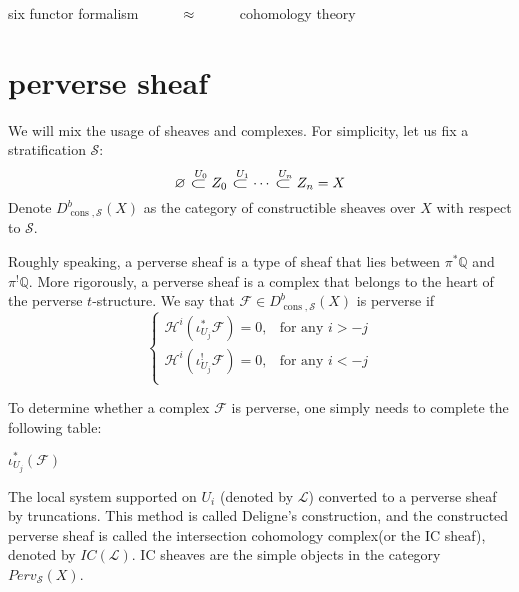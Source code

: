 \documentclass[UTF8]{amsart}
\numberwithin{equation}{section}
\theoremstyle{plain}
\numberwithin{equation}{section}
\theoremstyle{remark}
\DeclareMathOperator{\constructable}{\operatorname{cons}}
\begin{document}
six functor formalism $\hspace{10mm}\approx\hspace{10mm}$ cohomology theory

\section{perverse sheaf}

We will mix the usage of sheaves and complexes. For simplicity, let us fix a stratification $\mathcal{S}$:
\newcommand\largesubset{\mathrel{\scalebox{1.5}[1]{\(\subset\)}}}
$$\varnothing \overset{\;\,U_0}{\largesubset} Z_0 \overset{\;\,U_1}{\largesubset}\cdots  \overset{\;\,U_n}{\largesubset} Z_n = X$$
Denote $D_{\constructable,\mathcal{S}}^{b}(X)$ as the category of constructible sheaves over $X$ with respect to $\mathcal{S}$.

Roughly speaking, a perverse sheaf is a type of sheaf that lies between $\pi^* \mathbb{Q}$ and $\pi^! \mathbb{Q}$. More rigorously, a perverse sheaf is a complex that belongs to the heart of the perverse $t$-structure. We say that $\mathcal{F} \in D_{\constructable,\mathcal{S}}^{b}(X)$ is perverse if 
$$
\begin{cases}
\mathcal{H}^i\left(\iota_{U_j}^* \mathcal{F}\right) = 0, & \text{for any } i > -j\\
\mathcal{H}^i\left(\iota_{U_j}^! \mathcal{F}\right) = 0, & \text{for any } i < -j\\
\end{cases}
$$


To determine whether a complex $\mathcal{F}$ is perverse, one simply needs to complete the following table:

$\iota_{U_j}^*(\mathcal{F})$

The local system supported on $U_i$ (denoted by $\mathcal{L}$) converted to a perverse sheaf by truncations. This method is called Deligne's construction, and the constructed perverse sheaf is called the intersection cohomology complex(or the IC sheaf), denoted by $IC(\mathcal{L})$. IC sheaves are the simple objects in the category $Perv_{\mathcal{S}}(X)$.







\end{document}
